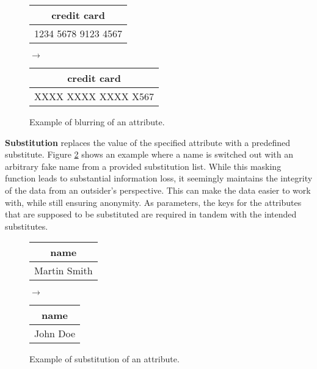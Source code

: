 \begin{figure}[ht]
    \begin{center}
    \footnotesize{
        \renewcommand{\arraystretch}{1.5}
        \begin{tabular}{|c|}
            \hline
            credit card \\
            \hline
            1234 5678 9123 4567 \\
            \hline
            \end{tabular}
            \quad $\longrightarrow$ \quad
            \begin{tabular}{|c|}
            \hline
            credit card \\
            \hline
            XXXX XXXX XXXX X567 \\
            \hline
        \end{tabular}
    }
    \end{center}
    \caption{Example of blurring of an attribute.\label{fig:blurring}}
\end{figure}

\textbf{Substitution} replaces the value of the specified attribute with a predefined substitute. Figure \ref{fig:substitution} shows an example where a name is switched out with an arbitrary fake name from a provided substitution list. While this masking function leads to substantial information loss, it seemingly maintains the integrity of the data from an outsider's perspective. This can make the data easier to work with, while still ensuring anonymity. As parameters, the keys for the attributes that are supposed to be substituted are required in tandem with the intended substitutes. 

\bigskip

\begin{figure}[ht]
    \begin{center}
    \footnotesize{
        \renewcommand{\arraystretch}{1.5}
        \begin{tabular}{|c|}
            \hline
            name \\
            \hline
            Martin Smith \\
            \hline
            \end{tabular}
            \quad $\longrightarrow$ \quad
            \begin{tabular}{|c|}
            \hline
            name \\
            \hline
            John Doe \\
            \hline
        \end{tabular}
    }
    \end{center}
    \caption{Example of substitution of an attribute.\label{fig:substitution}}
\end{figure}

